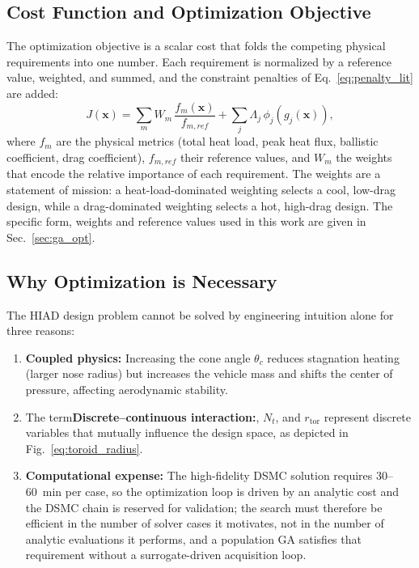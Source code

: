 \subsection{Cost Function and Optimization Objective}

The optimization objective is a scalar cost that folds the competing physical requirements into one number. Each requirement is normalized by a reference value, weighted, and summed, and the constraint penalties of Eq.~\eqref{eq:penalty_lit} are added:
\begin{equation}
    J(\mathbf{x}) = \sum_{m} W_m \, \frac{f_m(\mathbf{x})}{f_{m,ref}} + \sum_{j} \Lambda_j \, \phi_j\!\left(g_j(\mathbf{x})\right),
    \label{eq:cost_function}
\end{equation}
\noindent where $f_m$ are the physical metrics (total heat load, peak heat flux, ballistic coefficient, drag coefficient), $f_{m,ref}$ their reference values, and $W_m$ the weights that encode the relative importance of each requirement. The weights are a statement of mission: a heat-load-dominated weighting selects a cool, low-drag design, while a drag-dominated weighting selects a hot, high-drag design. The specific form, weights and reference values used in this work are given in Sec.~\ref{sec:ga_opt}.

\subsection{Why Optimization is Necessary}

The HIAD design problem cannot be solved by engineering intuition alone for three reasons:

\begin{enumerate}
    \item \textbf{Coupled physics:} Increasing the cone angle $\theta_c$ reduces stagnation heating (larger nose radius) but increases the vehicle mass and shifts the center of pressure, affecting aerodynamic stability.

    \item The term\textbf{Discrete--continuous interaction:}, $N_t$, and $r_{\text{tor}}$ represent discrete variables that mutually influence the design space, as depicted in Fig.~\ref{eq:toroid_radius}.

    \item \textbf{Computational expense:} The high-fidelity DSMC solution requires 30--60~min per case, so the optimization loop is driven by an analytic cost and the DSMC chain is reserved for validation; the search must therefore be efficient in the number of solver cases it motivates, not in the number of analytic evaluations it performs, and a population GA satisfies that requirement without a surrogate-driven acquisition loop.
\end{enumerate}

